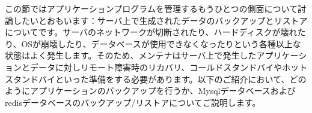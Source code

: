 この節ではアプリケーションプログラムを管理するもうひとつの側面について討論したいとおもいます：サーバ上で生成されたデータのバックアップとリストアについてです。サーバのネットワークが切断されたり、ハードディスクが壊れたり、OSが崩壊したり、データベースが使用できなくなったりという各種以上な状態はよく発生します。そのため、メンテナはサーバ上で発生したアプリケーションとデータに対しリモート障害時のリカバリ、コールドスタンドバイやホットスタンドバイといった準備をする必要があります。以下のご紹介において、どのようにアプリケーションのバックアップを行うか、Mysqlデータベースおよびredisデータベースのバックアップ/リストアについてご説明します。
